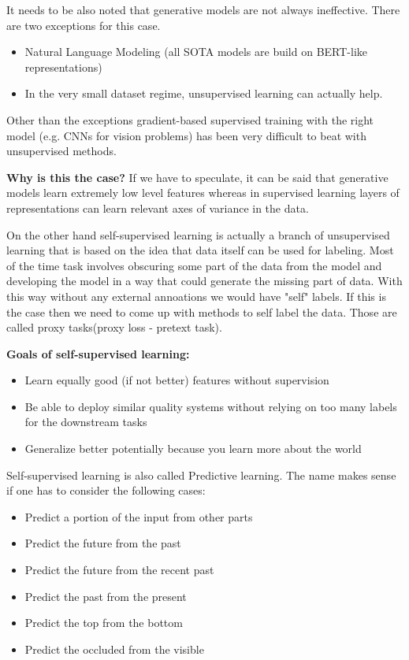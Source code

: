 \documentclass{article}
\begin{document}
It needs to be also noted that generative models are not always ineffective.
There are two exceptions for this case.
 
\begin{itemize}
   \item Natural Language Modeling (all SOTA models are build
   on BERT-like representations)
   \item In the very small dataset regime,
   unsupervised learning can actually help.
\end{itemize}
 
Other than the exceptions gradient-based supervised training with the
right model (e.g. CNNs for vision problems) has been very difficult to beat
with unsupervised methods.
 
\textbf{Why is this the case?}
If we have to speculate, it can be said that generative models
learn extremely low level features whereas in supervised learning
layers of representations can learn relevant axes of variance in the data.
 
\par
On the other hand self-supervised learning is actually a
branch of unsupervised learning that is based on the idea
that data itself can be used for labeling. Most of the time
task involves obscuring some part of the data from the model and
developing the model in a way that could generate the missing part
of data. With this way without any external annoations we would have
"self" labels. If this is the case then we need to come up with
methods to self label the data. Those are called proxy tasks(proxy loss
- pretext task).
 
\textbf{Goals of self-supervised learning:}
 
\begin{itemize}
   \item Learn equally good (if not better) features without supervision
   \item Be able to deploy similar quality systems without relying on too many labels for the downstream tasks
   \item Generalize better potentially because you learn more about the world
\end{itemize}
 
Self-supervised learning is also called Predictive learning.
The name makes sense if one has to consider the following cases:
 
\begin{itemize}
   \item Predict a portion of the input from other parts
   \item Predict the future from the past
   \item Predict the future from the recent past
   \item Predict the past from the present
   \item Predict the top from the bottom
   \item Predict the occluded from the visible
\end{itemize}
 
\end{document}
